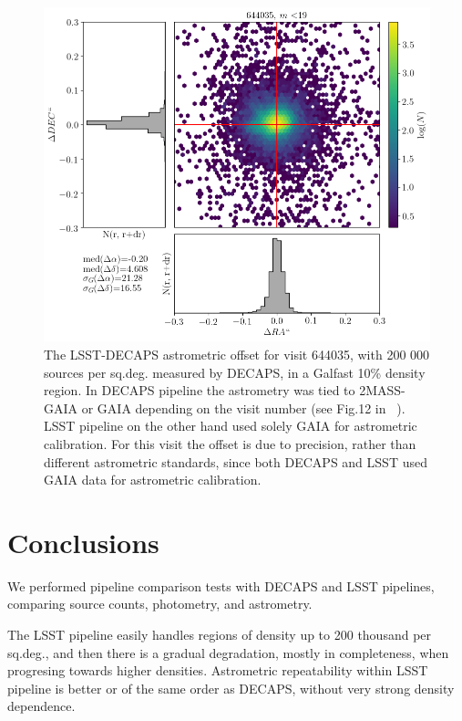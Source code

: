 \documentclass[DM,lsstdraft,toc,usenatbib]{lsstdoc}
\begin{document}
\begin{figure}
\begin{centering}
\includegraphics[width=0.8\columnwidth]{figs/lsst_decaps_644035_dra_ddec_m_lt19.png}
\caption{The LSST-DECAPS astrometric offset for visit 644035, with 200 000 sources per sq.deg. measured by DECAPS, in a Galfast 10\% density region. In DECAPS pipeline the astrometry was tied to  2MASS-GAIA or GAIA depending on the visit number (see Fig.12 in ~\cite{schlafly2017}).  LSST pipeline on the other hand used solely GAIA for astrometric calibration. For this visit the offset is due to precision, rather than different astrometric standards, since both DECAPS and LSST used GAIA data for astrometric calibration.}
\label{fig:ra_dec_lsst_decaps}
\end{centering}
\end{figure} 




\section{Conclusions}
\label{sec:conclusions}
We performed pipeline comparison tests with DECAPS and LSST pipelines, comparing source counts, photometry, and astrometry. 

The LSST pipeline easily handles regions of density up to 200 thousand per sq.deg., and then there is a gradual degradation, mostly in completeness, when progresing towards higher densities. Astrometric repeatability within LSST pipeline is better or of the same order as DECAPS, without very strong density dependence. 
\end{document}
